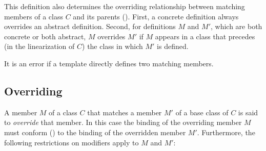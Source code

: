 This definition also determines the overriding relationship between matching members of a class $C$ and its parents (). First, a concrete definition always overrides an abstract definition. Second, for definitions $M$ and $M'$, which are both concrete or both abstract, $M$ overrides $M'$ if $M$ appears in a class that precedes (in the linearization of $C$) the class in which $M'$ is defined. 

It is an error if a template directly defines two matching members. 




\subsection{Overriding}
\label{sec:overriding}

A member $M$ of a class $C$ that matches a member $M'$ of a base class of $C$ is said to {\em override} that member. In this case the binding of the overriding member $M$ must conform () to the binding of the overridden member $M'$. Furthermore, the following restrictions on modifiers apply to $M$ and $M'$: 
